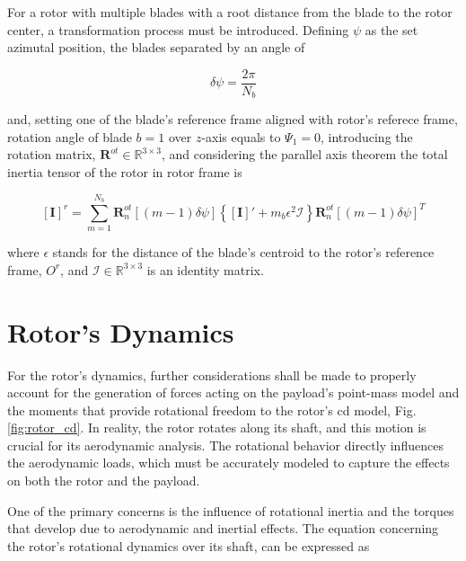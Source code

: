 For a rotor with multiple blades with a root distance from the blade to the rotor center, a transformation process must be introduced. Defining $\psi$ as the set azimutal position, the blades separated by an angle of

\begin{equation}
    \delta\psi = \frac{2\pi}{N_b}
\end{equation}

\noindent and, setting one of the blade's reference frame aligned with rotor's referece frame, rotation angle of blade $b=1$ over $z$-axis equals to $\Psi_1 = 0$, introducing the rotation matrix, $\boldsymbol{R}^{ot} \in \mathbb{R}^{3 \times 3}$, and considering the parallel axis theorem the total inertia tensor of the rotor in rotor frame is

\begin{equation}
    \left[\mathbf{I}\right]^r = \sum_{m=1}^{N_b} \boldsymbol{R}_n^{ot}\left[(m-1)\delta\psi\right] \left\{ \left[\mathbf{I}\right]' + m_b \epsilon^2 \boldsymbol{\mathcal{I}} \right\} \boldsymbol{R}_n^{ot}\left[(m-1)\delta\psi\right]^T
\end{equation}

\noindent where $\epsilon$ stands for the distance of the blade's centroid to the rotor’s reference frame, $O^r$, and $\boldsymbol{\mathcal{I}} \in \mathbb{R}^{3 \times 3}$ is an identity matrix.





\section{Rotor's Dynamics}
\label{section:rotor_dynamics}

For the rotor's dynamics, further considerations shall be made to properly account for the generation of forces acting on the payload's point-mass model and the moments that provide rotational freedom to the rotor's \gls{cd} model, Fig. \ref{fig:rotor_cd}. In reality, the rotor rotates along its shaft, and this motion is crucial for its aerodynamic analysis. The rotational behavior directly influences the aerodynamic loads, which must be accurately modeled to capture the effects on both the rotor and the payload.

One of the primary concerns is the influence of rotational inertia and the torques that develop due to aerodynamic and inertial effects. The equation concerning the rotor’s rotational dynamics over its shaft, can be expressed as

